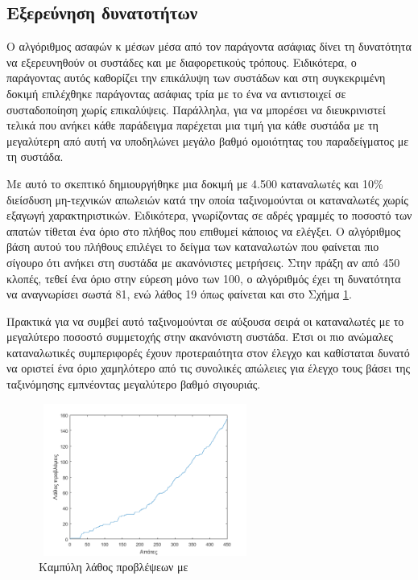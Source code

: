 \subsection{Εξερεύνηση δυνατοτήτων }
Ο αλγόριθμος ασαφών κ μέσων μέσα από τον παράγοντα ασάφιας δίνει τη δυνατότητα να εξερευνηθούν οι συστάδες και με διαφορετικούς τρόπους. Ειδικότερα, ο παράγοντας αυτός καθορίζει την επικάλυψη των συστάδων και στη συγκεκριμένη δοκιμή επιλέχθηκε παράγοντας ασάφιας τρία με το ένα να αντιστοιχεί σε συσταδοποίηση χωρίς επικαλύψεις. Παράλληλα, για να μπορέσει να διευκρινιστεί τελικά που ανήκει κάθε παράδειγμα παρέχεται μια τιμή για κάθε συστάδα με τη μεγαλύτερη από αυτή να υποδηλώνει μεγάλο βαθμό ομοιότητας του παραδείγματος με τη συστάδα.\par
Με αυτό το σκεπτικό δημιουργήθηκε μια δοκιμή με 4.500 καταναλωτές και 10\% διείσδυση μη-τεχνικών απωλειών κατά την οποία ταξινομούνται οι καταναλωτές χωρίς εξαγωγή χαρακτηριστικών. Ειδικότερα, γνωρίζοντας σε αδρές γραμμές το ποσοστό των απατών τίθεται ένα όριο στο πλήθος που επιθυμεί κάποιος να ελέγξει. Ο αλγόριθμος βάση αυτού του πλήθους επιλέγει το δείγμα των καταναλωτών που φαίνεται πιο σίγουρο ότι ανήκει στη συστάδα με ακανόνιστες μετρήσεις. Στην πράξη αν από 450 κλοπές, τεθεί ένα όριο στην εύρεση μόνο των 100, ο αλγόριθμός έχει τη δυνατότητα να αναγνωρίσει σωστά 81, ενώ λάθος 19 όπως φαίνεται και στο Σχήμα \ref{fig:wrongpredFCM}.\par
Πρακτικά για να συμβεί αυτό ταξινομούνται σε αύξουσα σειρά οι καταναλωτές με το μεγαλύτερο ποσοστό συμμετοχής στην ακανόνιστη συστάδα. Έτσι οι πιο ανώμαλες καταναλωτικές συμπεριφορές έχουν προτεραιότητα στον έλεγχο και καθίσταται δυνατό να οριστεί ένα όριο χαμηλότερο από τις συνολικές απώλειες για έλεγχο τους βάσει της ταξινόμησης εμπνέοντας μεγαλύτερο βαθμό σιγουριάς.\par
\begin{figure}[ht!]
\centering
 \includegraphics[width=70mm, height=50mm]{../../plots/confident_predictions.png}
\caption{Καμπύλη λάθος προβλέψεων με }
\label{fig:wrongpredFCM}
\end{figure}
